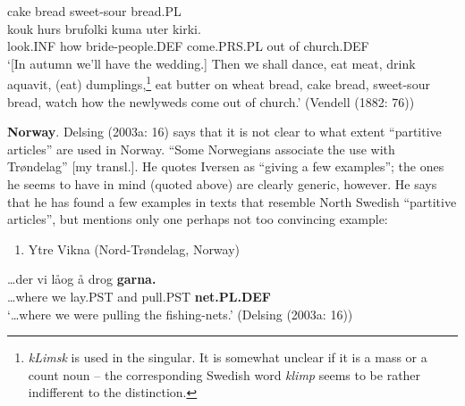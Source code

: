 cake bread  sweet-sour  bread.PL\\ %


\ea\label{}
\gll kouk  hurs  brufolki  kuma  uter  kirki.\\


look.INF  how  bride-people.DEF  come.PRS.PL  out of   church.DEF\\ %


‘[In autumn we’ll have the wedding.] Then we shall dance, eat meat, drink aquavit, (eat) dumplings,\footnote{ \textit{k}\textit{L}\textit{imsk} is used in the singular. It is somewhat unclear if it is a mass or a count noun – the corresponding Swedish word \textit{klimp} seems to be rather indifferent to the distinction.  } eat butter on wheat bread, cake bread, sweet-sour bread, watch how the newlyweds come out of church.’ (Vendell (1882: 76))
\z

\textbf{Norway}. Delsing (2003a: 16) says that it is not clear to what extent “partitive articles” are used in Norway. “Some Norwegians associate the use with Trøndelag” [my transl.]. He quotes Iversen as “giving a few examples”; the ones he seems to have in mind (quoted above) are clearly generic, however. He says that he has found a few examples in texts that resemble North Swedish “partitive articles”, but mentions only one perhaps not too convincing example: 

\begin{enumerate} %
\item 
Ytre Vikna (Nord-Trøndelag, Norway)

\end{enumerate} %
\ea\label{}
\gll …der  vi  låog  å  drog  \textbf{garna.}\textit{  }\\


…where  we  lay.PST   and  pull.PST  \textbf{net.PL.DEF} \\ %


‘…where we were pulling the fishing-nets.’ (Delsing (2003a: 16))
\z

